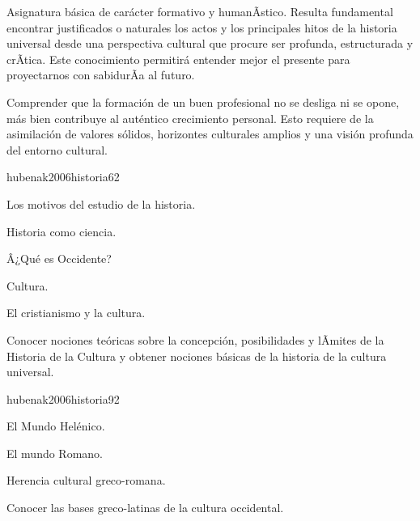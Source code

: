 \begin{syllabus}


\begin{justification}
Asignatura básica de carácter formativo y humanÃ­stico. Resulta fundamental encontrar justificados o naturales los actos y los principales hitos de la historia universal desde una perspectiva cultural que procure ser profunda, estructurada y crÃ­tica. Este conocimiento permitirá entender mejor el presente para proyectarnos con sabidurÃ­a al futuro.
\end{justification}

\begin{goals}
\item Comprender que la formación de un buen profesional no se desliga ni se opone, más bien contribuye al auténtico crecimiento personal. Esto requiere de la asimilación de valores sólidos, horizontes culturales amplios y una visión profunda del entorno cultural.
\end{goals}

\begin{outcomes}
\end{outcomes}

\begin{unit}{}{hubenak2006historia}{6}{2}
\begin{topics}
	\item Los motivos del estudio de la historia. 	
	\item Historia como ciencia. 	
	\item Â¿Qué es Occidente? 	
	\item Cultura. 	
	\item El cristianismo y la cultura. 
\end{topics}
\begin{unitgoals}
	\item Conocer nociones teóricas sobre la concepción, posibilidades y lÃ­mites de la Historia de la Cultura y obtener nociones básicas de la historia de la cultura universal.
\end{unitgoals}
\end{unit}

\begin{unit}{}{hubenak2006historia}{9}{2}
\begin{topics}
	\item El Mundo Helénico. 	
	\item El mundo Romano. 	
	\item Herencia cultural greco-romana. 
\end{topics}
\begin{unitgoals}
	\item Conocer las bases greco-latinas de la cultura occidental.
\end{unitgoals}
\end{unit}


\end{syllabus}
